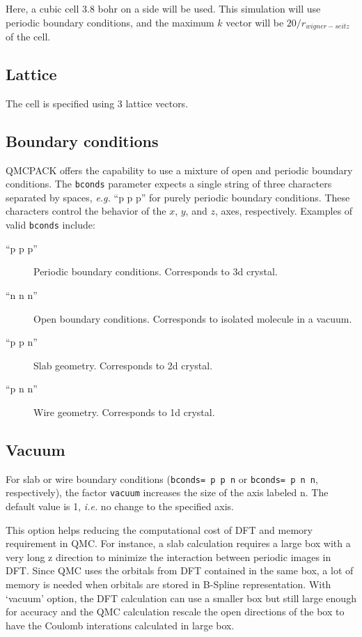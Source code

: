 Here, a cubic cell 3.8 bohr on a side will be used.
This simulation will use periodic boundary conditions, and the maximum
$k$ vector will be $20/r_{wigner-seitz}$ of the cell.


\subsection{Lattice}
The cell is specified using 3 lattice vectors.


\subsection{Boundary conditions}
QMCPACK offers the capability to use a mixture of open and periodic boundary conditions.
The \texttt{bconds} parameter expects a single string of three characters separated by
spaces, \textit{e.g.} ``p p p'' for purely periodic boundary conditions. These characters control
the behavior of the $x$, $y$, and $z$, axes, respectively.
Examples of valid \texttt{bconds} include:

\begin{description}
\item[``p p p''] Periodic boundary conditions. Corresponds to 3d crystal.
\item[``n n n''] Open boundary conditions. Corresponds to isolated molecule in a vacuum.
\item[``p p n''] Slab geometry. Corresponds to 2d crystal.
\item[``p n n''] Wire geometry. Corresponds to 1d crystal.
\end{description}

\subsection{Vacuum}
For slab or wire boundary conditions (\texttt{bconds= p p n} or \texttt{bconds= p n n}, respectively),
the factor \texttt{vacuum} increases the size of the axis labeled n. The default value is 1,
\textit{i.e.} no change to the specified axis.

This option helps reducing the computational cost of DFT and memory requirement in QMC.
For instance, a slab calculation requires a large box with a very long z direction
to minimize the interaction between periodic images in DFT.
Since QMC uses the orbitals from DFT contained in the same box,
a lot of memory is needed when orbitals are stored in B-Spline representation.
With `vacuum' option, the DFT calculation can use a smaller box but still large enough for accuracy
and the QMC calculation rescale the open directions of the box to
have the Coulomb interations calculated in large box.

